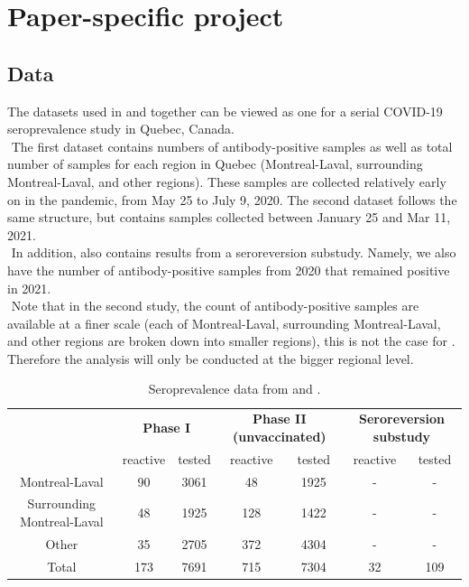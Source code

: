 \section{Paper-specific project}

\subsection{Data}
The datasets used in \cite{lewin2021sars} and \cite{lewin2022seroprevalence} together can be viewed as one for a serial COVID-19 seroprevalence study in Quebec, Canada. \\
\newline $ $
The first dataset contains numbers of antibody-positive samples as well as total number of samples for each region in Quebec (Montreal-Laval, surrounding Montreal-Laval, and other regions). These samples are collected relatively early on in the pandemic, from May 25 to July 9, 2020. The second dataset follows the same structure, but contains samples collected between January 25 and Mar 11, 2021. \\
\newline $ $
In addition, \cite{lewin2022seroprevalence} also contains results from a seroreversion substudy. Namely, we also have the number of antibody-positive samples from 2020 that remained positive in 2021. \\
\newline $ $
Note that in the second study, the count of antibody-positive samples are available at a finer scale (each of Montreal-Laval, surrounding Montreal-Laval, and other regions are broken down into smaller regions), this is not the case for \cite{lewin2021sars}. Therefore the analysis will only be conducted at the bigger regional level.

\begin{table}[]
\centering
\label{tab:dat}
\begin{tabular}{c|cc|cc|cc}
                           & \multicolumn{2}{c}{\textbf{Phase I}} & \multicolumn{2}{c}{\textbf{Phase II (unvaccinated)}} & \multicolumn{2}{c}{\textbf{Seroreversion substudy}}\\
                           & reactive      & tested      & reactive              & tested      & reactive              & tested        \\
                           \hline
Montreal-Laval             & 90            & 3061        & 48                    & 1925      & - & -          \\
Surrounding Montreal-Laval & 48            & 1925        & 128                   & 1422   & - & -             \\
Other                      & 35            & 2705        & 372                   & 4304          & - & -      \\
\hline
Total                      & 173           & 7691        & 715                   & 7304          &    32 & 109  
\end{tabular}
\caption{Seroprevalence data from \cite{lewin2021sars} and \cite{lewin2022seroprevalence}.}
\end{table}

